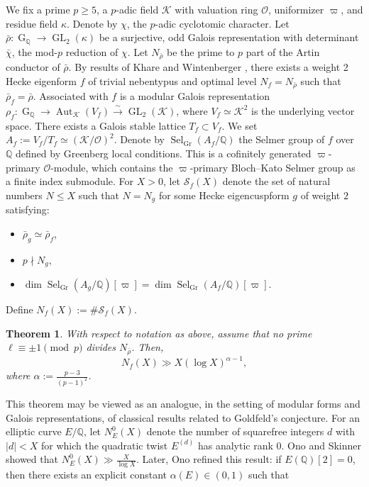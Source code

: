 \documentclass[table]{amsart}
\newtheorem{lthm}{Theorem}
\newcommand{\cK}{\mathcal{K}}
\newcommand{\Q}{\mathbb{Q}}
\newcommand{\cO}{\mathcal{O}}
\newcommand{\cS}{\mathcal{S}}
\newcommand{\op}[1]{\operatorname{#1}}
\numberwithin{equation}{section}
\begin{document}
\par We fix a prime $p \geq 5$, a $p$-adic field $\cK$ with valuation ring $\cO$, uniformizer $\varpi$, and residue field $\kappa$. Denote by $\chi$, the $p$-adic cyclotomic character. Let
$\bar{\rho} : \op{G}_\Q \to \op{GL}_2(\kappa)$
be a surjective, odd Galois representation with determinant $\bar{\chi}$, the mod-$p$ reduction of $\chi$. Let $N_{\bar{\rho}}$ be the prime to $p$ part of the Artin conductor of $\bar{\rho}$. By results of Khare and Wintenberger \cite{khare2009serre, khare2009serre2}, there exists a weight 2 Hecke eigenform $f$ of trivial nebentypus and optimal level $N_f = N_{\bar{\rho}}$ such that $\bar{\rho}_f = \bar{\rho}$. Associated with $f$ is a modular Galois representation $\rho_f:\op{G}_\Q\rightarrow \op{Aut}_{\cK} (V_f)\xrightarrow{\sim}\op{GL}_2(\cK)$, where $V_f\simeq \cK^2$ is the underlying vector space. There exists a Galois stable lattice $T_f\subset V_f$. We set $A_f:=V_f/T_f\simeq (\cK/\cO)^2$. Denote by $\op{Sel}_{\op{Gr}}(A_f/\Q)$ the Selmer group of $f$ over $\Q$ defined by Greenberg local conditions. This is a cofinitely generated $\varpi$-primary $\cO$-module, which contains the $\varpi$-primary Bloch--Kato Selmer group as a finite index submodule. For \( X > 0 \), let \( \cS_f(X) \) denote the set of natural numbers \( N \leq X \) such that \( N = N_g \) for some Hecke eigencuspform \( g \) of weight \( 2 \) satisfying:
\begin{itemize}
    \item \( \bar{\rho}_g \simeq \bar{\rho}_f \),
    \item $p\nmid N_g$,
    \item \( \dim \op{Sel}_{\op{Gr}}(A_g/\Q)[\varpi] = \dim \op{Sel}_{\op{Gr}}(A_f/\Q)[\varpi] \).
\end{itemize}
Define \( N_f(X) := \# \cS_f(X) \).

\begin{lthm}\label{main thm of intro}
With respect to notation as above, assume that no prime $\ell\equiv \pm 1\pmod{p}$ divides $N_{\bar{\rho}}$. Then,
$$
N_f(X) \gg X (\log X)^{\alpha - 1},
$$
\noindent where $\alpha := \frac{p - 3}{(p - 1)^2}$.
\end{lthm}

This theorem may be viewed as an analogue, in the setting of modular forms and Galois representations, of classical results related to Goldfeld’s conjecture. For an elliptic curve $E/\Q$, let $N_E^0(X)$ denote the number of squarefree integers $d$ with $|d| < X$ for which the quadratic twist $E^{(d)}$ has analytic rank 0. Ono and Skinner \cite{OnoSkinner} showed that $N_E^0(X) \gg \frac{X}{\log X}$. Later, Ono \cite{OnoCrelle} refined this result: if $E(\Q)[2] = 0$, then there exists an explicit constant $\alpha(E) \in (0,1)$ such that
\end{document}
